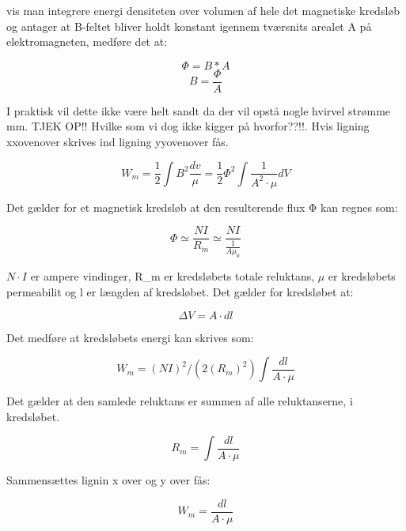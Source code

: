 vis man integrere energi densiteten over volumen af hele det magnetiske kredsløb og antager at B-feltet bliver holdt konstant igennem tværsnits arealet A på elektromagneten, medføre det at:

\begin{equation}
\Phi=B*A
\end{equation}
\begin{equation}
B=\frac{\Phi}{A} 
\end{equation}


I praktisk vil dette ikke være helt sandt da der vil opstå nogle hvirvel strømme mm. TJEK OP!! Hvilke som vi dog ikke kigger på hvorfor??!!. Hvis ligning xxovenover skrives ind ligning yyovenover fås.

\begin{equation}
W_m = \frac{1}{2} \int B^2 \frac{dv}{\mu}  = \frac{1}{2} \Phi^2 \int \frac{1}{A^2 \cdot \mu} dV
\end{equation}

Det gælder for et magnetisk kredsløb at den resulterende flux Φ kan regnes som:

\begin{equation}
\Phi \simeq \frac{NI}{R_m} \simeq  \frac{NI}{\frac{1}{A\mu_0}}
\end{equation}

$N \cdot I$ er ampere vindinger, R_m er kredsløbets totale reluktans, $ \mu $ er kredsløbets permeabilit og l er længden af kredsløbet. Det gælder for kredsløbet at:

\begin{equation}
\Delta V =A \cdot dl 
\end{equation}

Det medføre at kredsløbets energi kan skrives som:

\begin{equation}
W_m = (NI)^2/(2(R_m)^2) \int \frac{dl}{A \cdot \mu} 
\end{equation}

Det gælder at den samlede reluktans er summen af alle reluktanserne, i kredsløbet.

\begin{equation}
R_m = \int \frac{dl}{A \cdot \mu} 
\end{equation}

Sammensættes lignin x over og y over fås:

\begin{equation}
W_m = \frac{dl}{A \cdot \mu} 
\end{equation}

